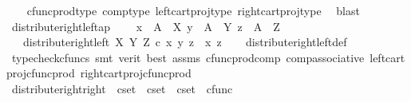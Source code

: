 \begin{isabellebody}
\ \ \isamarkupfalse%
\ cfunc{\isacharunderscore}{\kern0pt}prod{\isacharunderscore}{\kern0pt}type\ comp{\isacharunderscore}{\kern0pt}type\ left{\isacharunderscore}{\kern0pt}cart{\isacharunderscore}{\kern0pt}proj{\isacharunderscore}{\kern0pt}type\ right{\isacharunderscore}{\kern0pt}cart{\isacharunderscore}{\kern0pt}proj{\isacharunderscore}{\kern0pt}type\ \isamarkupfalse%
\ blast%
\endisatagproof
{\isafoldproof}%
%
\isadelimproof
\isanewline
%
\endisadelimproof
\isanewline
{}\isamarkupfalse%
\ distribute{\isacharunderscore}{\kern0pt}right{\isacharunderscore}{\kern0pt}left{\isacharunderscore}{\kern0pt}ap{\isacharcolon}{\kern0pt}\ \isanewline
\ \ \ {\isachardoublequoteopen}x\ {\isacharcolon}{\kern0pt}\ A\ {\isasymrightarrow}\ X{\isachardoublequoteclose}\ {\isachardoublequoteopen}y\ {\isacharcolon}{\kern0pt}\ A\ {\isasymrightarrow}\ Y{\isachardoublequoteclose}\ {\isachardoublequoteopen}z\ {\isacharcolon}{\kern0pt}\ A\ {\isasymrightarrow}\ Z{\isachardoublequoteclose}\isanewline
\ \ \ {\isachardoublequoteopen}distribute{\isacharunderscore}{\kern0pt}right{\isacharunderscore}{\kern0pt}left\ X\ Y\ Z\ {\isasymcirc}\isactrlsub c\ {\isasymlangle}{\isasymlangle}x{\isacharcomma}{\kern0pt}\ y{\isasymrangle}{\isacharcomma}{\kern0pt}\ z{\isasymrangle}\ {\isacharequal}{\kern0pt}\ {\isasymlangle}x{\isacharcomma}{\kern0pt}\ z{\isasymrangle}{\isachardoublequoteclose}\isanewline
%
\isadelimproof
\ \ %
\endisadelimproof
%
\isatagproof
{}\isamarkupfalse%
\ distribute{\isacharunderscore}{\kern0pt}right{\isacharunderscore}{\kern0pt}left{\isacharunderscore}{\kern0pt}def\ \isanewline
\ \ \isamarkupfalse%
\ {\isacharparenleft}{\kern0pt}typecheck{\isacharunderscore}{\kern0pt}cfuncs{\isacharcomma}{\kern0pt}\ smt\ {\isacharparenleft}{\kern0pt}verit{\isacharcomma}{\kern0pt}\ best{\isacharparenright}{\kern0pt}\ assms\ cfunc{\isacharunderscore}{\kern0pt}prod{\isacharunderscore}{\kern0pt}comp\ comp{\isacharunderscore}{\kern0pt}associative{}\ left{\isacharunderscore}{\kern0pt}cart{\isacharunderscore}{\kern0pt}proj{\isacharunderscore}{\kern0pt}cfunc{\isacharunderscore}{\kern0pt}prod\ right{\isacharunderscore}{\kern0pt}cart{\isacharunderscore}{\kern0pt}proj{\isacharunderscore}{\kern0pt}cfunc{\isacharunderscore}{\kern0pt}prod{\isacharparenright}{\kern0pt}%
\endisatagproof
{\isafoldproof}%
%
\isadelimproof
\isanewline
%
\endisadelimproof
\isanewline
{}\isamarkupfalse%
\ distribute{\isacharunderscore}{\kern0pt}right{\isacharunderscore}{\kern0pt}right\ {\isacharcolon}{\kern0pt}{\isacharcolon}{\kern0pt}\ {\isachardoublequoteopen}cset\ {\isasymRightarrow}\ cset\ {\isasymRightarrow}\ cset\ {\isasymRightarrow}\ cfunc{\isachardoublequoteclose}\ \isanewline

\end{isabellebody}
